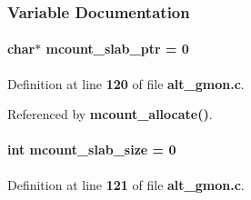 \subsubsection{Variable Documentation}
\paragraph[{mcount\+\_\+slab\+\_\+ptr}]{\setlength{\rightskip}{0pt plus 5cm}char$\ast$ mcount\+\_\+slab\+\_\+ptr = 0\hspace{0.3cm}{\ttfamily [static]}}\label{alt__gmon_8c_a0734a881ed6cfe8ddf79f97c28cdb6fb}


Definition at line {\bf 120} of file {\bf alt\+\_\+gmon.\+c}.



Referenced by {\bf mcount\+\_\+allocate()}.

\paragraph[{mcount\+\_\+slab\+\_\+size}]{\setlength{\rightskip}{0pt plus 5cm}int mcount\+\_\+slab\+\_\+size = 0\hspace{0.3cm}{\ttfamily [static]}}\label{alt__gmon_8c_adf5566bdaccb05e4ecdde37d07689061}


Definition at line {\bf 121} of file {\bf alt\+\_\+gmon.\+c}.

